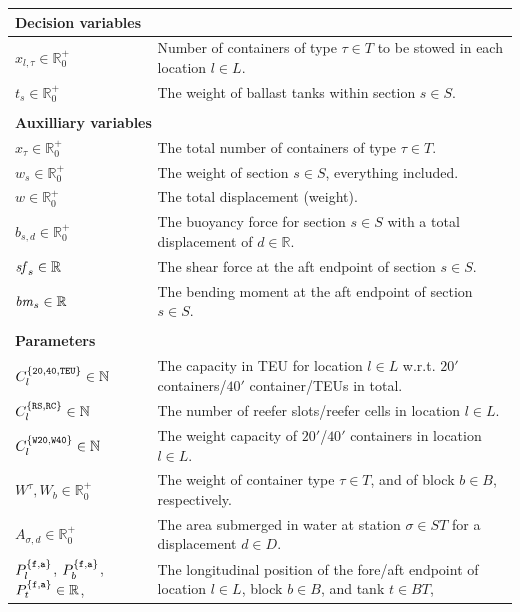 \begin{longtable}
{p{3.7cm}p{11.5cm}}
\multicolumn{2}{l}{\textbf{Decision variables}}\\
\hline\noalign{\smallskip}
$x_{l,\tau}\in \mathbb{R}^+_0$		& {Number of containers of type $\tau\in T$ to be stowed in each location $l\in L$}.\\
$t_s\in \mathbb{R}^+_0$						& {The weight of ballast tanks within section $s\in S$.}\\
\\
\multicolumn{2}{l}{\textbf{Auxilliary variables}}\\
\hline\noalign{\smallskip}
$x_\tau\in \mathbb{R}^+_0$ 				& {The total number of containers of type $\tau\in T$.}\\
$w_s\in \mathbb{R}^+_0$						& {The weight of section $s\in S$, everything included.}\\
$w\in \mathbb{R}^+_0$							& {The total displacement (weight).}\\
$b_{s,d} \in\mathbb{R}^+_0$ 			& {The buoyancy force for section $s \in S$ with a total displacement of $d\in \mathbb{R}$.}\\
$\mathit{sf}_s\in \mathbb{R}$ 				& {The shear force at the aft endpoint of section $s\in S$.}\\
$\mathit{bm}_s\in \mathbb{R}$ 				& {The bending moment at the aft endpoint of section $s\in S$.}\\
\\
\multicolumn{2}{l}{\textbf{Parameters}}\\
\hline\noalign{\smallskip}
$C_l^{\{\texttt{20}, \texttt{40}, \texttt{TEU}\}}\in \mathbb{N}$ 		& {The capacity in TEU for location $l\in L$ w.r.t. $20'$ containers/$40'$ container/TEUs in total.} \\
$C_l^{\{\texttt{RS}, \texttt{RC}\}}\in \mathbb{N}$								& {The number of reefer slots/reefer cells in location $l\in L$.}\\
$C_l^{\{\texttt{W20}, \texttt{W40}\}}\in \mathbb{N}$							& {The weight capacity of  $20'$/$40'$ containers in location $l\in L$.}\\
$W^\tau, W_b\in \mathbb{R}^+_0$															& {The weight of container type $\tau\in T$, and of block $b\in B$, respectively.} \\
$A_{\sigma, d}\in \mathbb{R}^+_0$ 													&	{The area submerged in water at station $\sigma\in ST$ for a displacement $d\in D$.}\\
$P^{\{\texttt{f},\texttt{a}\}}_{l}$, $P^{\{\texttt{f},\texttt{a}\}}_{b}$, $P^{\{\texttt{f},\texttt{a}\}}_{t}\in \mathbb{R}$, 
																														&	{The longitudinal position of the fore/aft endpoint of location $l\in L$, block $b \in B$, and tank $t \in BT$, 
}
\end{longtable}
